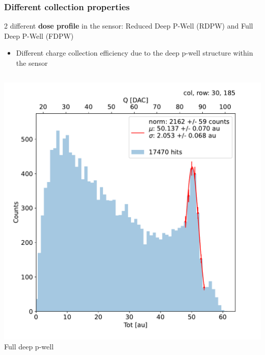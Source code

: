     \begin{frame}[noframenumbering]
        \frametitle{Different collection properties}
        2 different \textbf{dose profile} in the sensor: Reduced Deep P-Well (RDPW) and Full Deep P-Well (FDPW)

        \begin{itemize}
            \item Different charge collection efficiency due to the deep p-well structure within the sensor
        \end{itemize}
        \begin{columns}
                \includegraphics[width=1.1\linewidth]{figures/charaterization/fit_gauss_r185.pdf}
                \centering Full deep p-well

\end{columns}
\end{frame}
